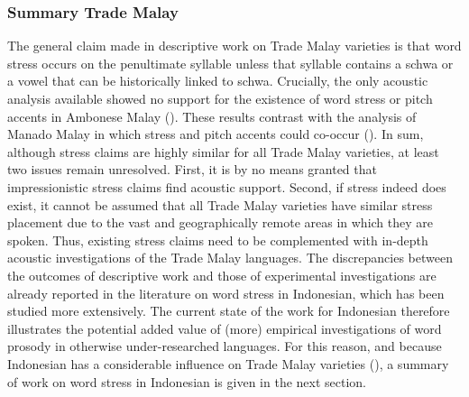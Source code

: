 \subsubsection{Summary Trade Malay}
The general claim made in descriptive work on Trade Malay varieties is that word stress occurs on the penultimate syllable unless that syllable contains a schwa or a vowel that can be historically linked to schwa. Crucially, the only acoustic analysis available showed no support for the existence of word stress or pitch accents in Ambonese Malay (\citealt{maskikit-essed_no_2016}). These results contrast with the analysis of Manado Malay in which stress and pitch accents could co-occur (\citealt{stoel_intonation_2007}). In sum, although stress claims are highly similar for all Trade Malay varieties, at least two issues remain unresolved. First, it is by no means granted that impressionistic stress claims find acoustic support. Second, if stress indeed does exist, it cannot be assumed that all Trade Malay varieties have similar stress placement due to the vast and geographically remote areas in which they are spoken. Thus, existing stress claims need to be complemented with in-depth acoustic investigations of the Trade Malay languages. The discrepancies between the outcomes of descriptive work and those of experimental investigations are already reported in the literature on word stress in Indonesian, which has been studied more extensively. The current state of the work for Indonesian therefore illustrates the potential added value of (more) empirical investigations of word prosody in otherwise under-researched languages. For this reason, and because Indonesian has a considerable influence on Trade Malay varieties (\citealt{paauw_malay_2009}), a summary of work on word stress in Indonesian is given in the next section.

